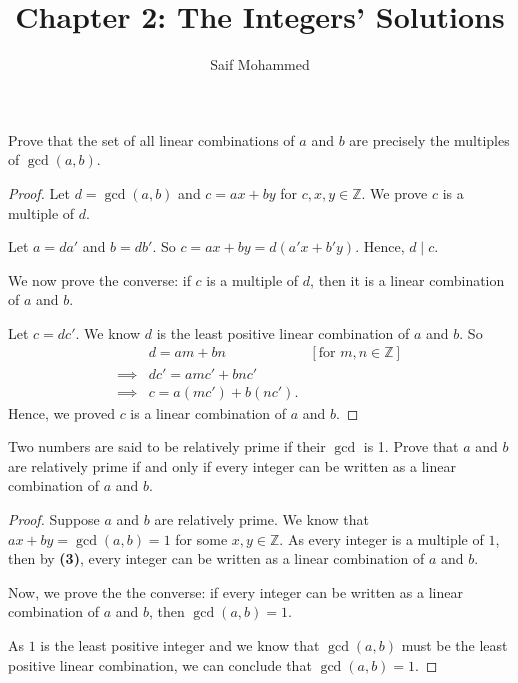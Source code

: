\documentclass[12pt]{article}
\newenvironment{exercise}[2][Exercise]{\begin{trivlist}
\item[\hskip \labelsep {\bfseries #1}\hskip \labelsep {\bfseries #2.}]}{\end{trivlist}}
\begin{document}
%
%

\title{Chapter 2: The Integers' Solutions} %
\author{Saif Mohammed} %
\maketitle
\begin{exercise}{3}
	Prove that the set of all linear combinations of \(a\) and \(b\) are precisely the multiples of \(\gcd(a, b)\).
\end{exercise}

\begin{proof}
	Let $d=\gcd(a,b)$ and $c=ax+by$ for $c,x,y\in \mathbb{Z}$. We prove $c$ is a multiple of $d$.

	Let $a=da'$ and $b=db'$. So $c=ax+by=d(a'x+b'y)$. Hence, $d \mid c$.

	We now prove the converse: if $c$ is a multiple of $d$, then it is a linear combination of $a$ and $b$.

	Let $c=dc'$. We know $d$ is the least positive linear combination of $a$ and $b$. So
	\begin{align*}
		         & d = am+bn          & \left[\text{for }m, n\in \mathbb{Z} \right] \\
		\implies & dc' = amc'+bnc'                                                  \\
		\implies & c = a(mc')+b(nc').
	\end{align*}
	Hence, we proved $c$ is a linear combination of $a$ and $b$.
\end{proof}

\begin{exercise}{4}
	Two numbers are said to be relatively prime if their \(\gcd\) is 1. Prove that \(a\) and \(b\) are relatively prime if and only if every integer can be written as a linear combination of \(a\) and \(b\).
\end{exercise}

\begin{proof}
	Suppose $a$ and $b$ are relatively prime. We know that $ax+by=\gcd(a,b)=1$ for some $x, y\in \mathbb{Z}$. As every integer is a multiple of $1$, then by \textbf{(3)}, every integer can be written as a linear combination of $a$ and $b$.

	Now, we prove the the converse: if every integer can be written as a linear combination of $a$ and $b$, then $\gcd(a,b)=1$.

	As $1$ is the least positive integer and we know that $\gcd(a,b)$ must be the least positive linear combination, we can conclude that $\gcd(a,b)=1$.
\end{proof}
\end{document}
